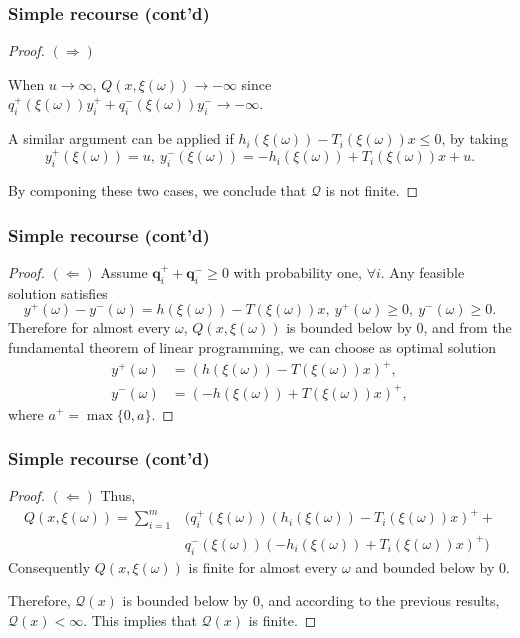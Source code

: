 \documentclass{beamer}
\begin{document}
\begin{frame}
\frametitle{Simple recourse (cont'd)}

\begin{proof}
{\bf $(\Rightarrow)$} 

When $u \rightarrow \infty$, $Q(x, \xi(\omega)) \rightarrow -\infty$ since $q_i^+(\xi(\omega))y_i^+ + q_i^-(\xi(\omega))y_i^- \rightarrow -\infty$.

\mbox{}

A similar argument can be applied if $h_i(\xi(\omega))-T_i(\xi(\omega))x \leq 0$, by taking
$$
y_i^+(\xi(\omega)) = u,\ y_i^-(\xi(\omega)) = -h_i(\xi(\omega)) + T_i(\xi(\omega))x + u.
$$

\mbox{}

By componing these two cases, we conclude that  $\mathcal{Q}$ is not finite.
\end{proof}

\end{frame}

\begin{frame}
\frametitle{Simple recourse (cont'd)}
	
\begin{proof}

{\bf $(\Leftarrow)$}
Assume $\boldsymbol{q}_i^+ + \boldsymbol{q}_i^- \geq 0$ with probability one, $\forall i$.
Any feasible solution satisfies
$$
y^+(\omega)-y^-(\omega)=h(\xi(\omega))-T(\xi(\omega))x, \ y^+(\omega) \geq 0,\ y^-(\omega) \geq 0.
$$
Therefore for almost every $\omega$, $Q(x,\xi(\omega))$ is bounded below by 0, and
from the fundamental theorem of linear programming, we can choose as optimal solution
\begin{align*}
y^+(\omega) &= \left(h(\xi(\omega))-T(\xi(\omega))x\right)^+,\\
y^-(\omega) &= \left(-h(\xi(\omega))+T(\xi(\omega))x\right)^+,
\end{align*}
where $a^+ = \max\{0, a\}$.
\end{proof}

\end{frame}

\begin{frame}
\frametitle{Simple recourse (cont'd)}

\begin{proof}
{\bf $(\Leftarrow)$}
Thus,
\begin{align*}
Q(x,\xi(\omega)) = \sum_{i=1}^{m} & (q_i^+(\xi(\omega))(h_i(\xi(\omega))-T_i(\xi(\omega))x)^+ + \\
& q_i^-(\xi(\omega))(-h_i(\xi(\omega))+T_i(\xi(\omega))x)^+ )
\end{align*}
Consequently $Q(x,\xi(\omega))$ is finite for almost every $\omega$ and bounded below by 0.

\mbox{}

Therefore, $\mathcal{Q}(x)$ is bounded below by 0, and according to the previous results, $\mathcal{Q}(x) < \infty$. This implies that $\mathcal{Q}(x)$ is finite.
\end{proof}

\end{frame}
\end{document}
